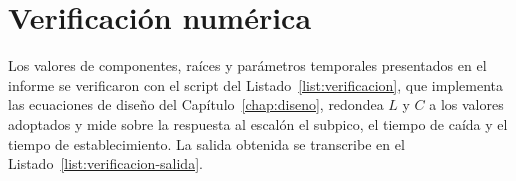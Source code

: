 \appendix
\chapter{Verificación numérica}
\label{chap:anexo}

Los valores de componentes, raíces y parámetros temporales presentados en el informe se verificaron con el
script del Listado~\ref{list:verificacion}, que implementa las ecuaciones de diseño del
Capítulo~\ref{chap:diseno}, redondea $L$ y $C$ a los valores adoptados y mide sobre la respuesta al escalón
el subpico, el tiempo de caída y el tiempo de establecimiento. La salida obtenida se transcribe en el
Listado~\ref{list:verificacion-salida}.




